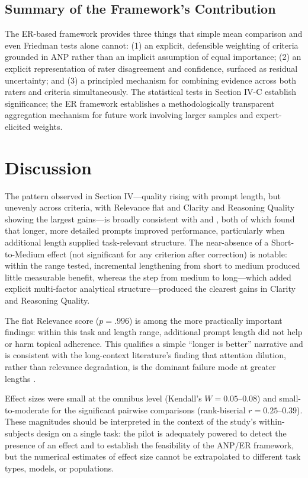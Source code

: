 \documentclass[conference]{IEEEtran}
\begin{document}
\subsection{Summary of the Framework's Contribution}
The ER-based framework provides three things that simple mean comparison and even Friedman tests alone cannot: (1) an explicit, defensible weighting of criteria grounded in ANP rather than an implicit assumption of equal importance; (2) an explicit representation of rater disagreement and confidence, surfaced as residual uncertainty; and (3) a principled mechanism for combining evidence across both raters and criteria simultaneously. The statistical tests in Section IV-C establish significance; the ER framework establishes a methodologically transparent aggregation mechanism for future work involving larger samples and expert-elicited weights.

\section{Discussion}
The pattern observed in Section IV---quality rising with prompt length, but unevenly across criteria, with Relevance flat and Clarity and Reasoning Quality showing the largest gains---is broadly consistent with \cite{liu2025} and \cite{balaji2024}, both of which found that longer, more detailed prompts improved performance, particularly when additional length supplied task-relevant structure. The near-absence of a Short-to-Medium effect (not significant for any criterion after correction) is notable: within the range tested, incremental lengthening from short to medium produced little measurable benefit, whereas the step from medium to long---which added explicit multi-factor analytical structure---produced the clearest gains in Clarity and Reasoning Quality.

The flat Relevance score ($p=.996$) is among the more practically important findings: within this task and length range, additional prompt length did not help or harm topical adherence. This qualifies a simple ``longer is better'' narrative and is consistent with the long-context literature's finding that attention dilution, rather than relevance degradation, is the dominant failure mode at greater lengths \cite{levy2024}.

Effect sizes were small at the omnibus level (Kendall's $W=0.05$--$0.08$) and small-to-moderate for the significant pairwise comparisons (rank-biserial $r=0.25$--$0.39$). These magnitudes should be interpreted in the context of the study's within-subjects design on a single task: the pilot is adequately powered to detect the presence of an effect and to establish the feasibility of the ANP/ER framework, but the numerical estimates of effect size cannot be extrapolated to different task types, models, or populations.
\end{document}
